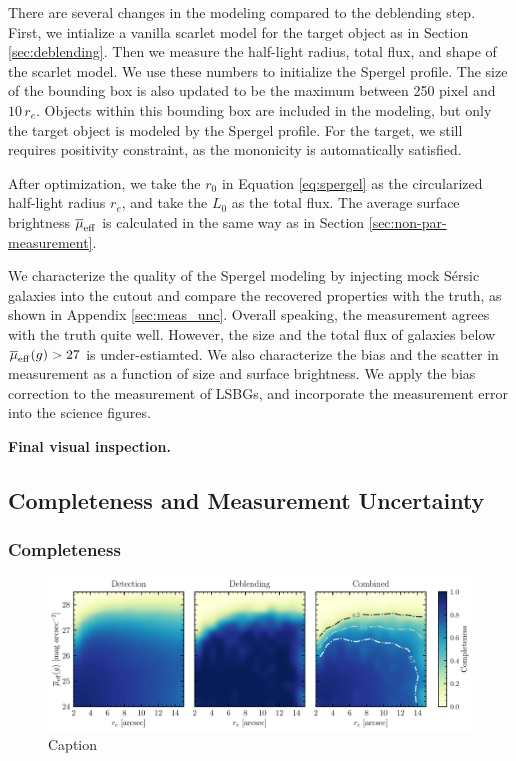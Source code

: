 \documentclass[twocolumn,astrosymb,twocolappendix]{aastex631}
\newcommand{\sersic}{S\'ersic}
\begin{document}
\begin{CJK*}{UTF8}{gbsn}
There are several changes in the modeling compared to the deblending step. First, we intialize a vanilla scarlet model for the target object as in Section \ref{sec:deblending}. Then we measure the half-light radius, total flux, and shape of the scarlet model. We use these numbers to initialize the Spergel profile. The size of the bounding box is also updated to be the maximum between 250 pixel and $10\, r_e$. Objects within this bounding box are included in the modeling, but only the target object is modeled by the Spergel profile. For the target, we still requires positivity constraint, as the mononicity is automatically satisfied. 

After optimization, we take the $r_0$ in Equation \eqref{eq:spergel} as the circularized half-light radius $r_e$, and take the $L_0$ as the total flux. The average surface brightness $\overline{\mu}_{\rm eff}$ is calculated in the same way as in Section \ref{sec:non-par-measurement}. 

We characterize the quality of the Spergel modeling by injecting mock \sersic{} galaxies into the cutout and compare the recovered properties with the truth, as shown in Appendix \ref{sec:meas_unc}. Overall speaking, the measurement agrees with the truth quite well. However, the size and the total flux of galaxies below $\overline{\mu}_{\rm eff} (g) > 27$ is under-estiamted. We also characterize the bias and the scatter in measurement as a function of size and surface brightness. We apply the bias correction to the measurement of LSBGs, and incorporate the measurement error into the science figures. 

\textbf{Final visual inspection.}

\subsection{Completeness and Measurement Uncertainty}

\subsubsection{Completeness}\label{sec:completeness}
\begin{figure}
	\vbox{ 
		\centering
		\includegraphics[width=1\linewidth]{completeness.pdf}
	}
	\caption{Caption}
	\label{fig:completeness}
\end{figure}


\end{CJK*}
\end{document}
